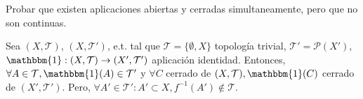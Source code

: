 \begin{ejr}[28]
  Probar que existen aplicaciones abiertas y cerradas simultaneamente, pero que no son continuas.
\end{ejr}

\begin{sol}[28]
  Sea $( X, \mathcal{T} )$, $( X, \mathcal{T}' )$, e.t. tal que $\mathcal{T} = \{ \emptyset, X \}$ topología trivial, $\mathcal{T}' = \mathcal{P}(X')$, $\mathbbm{1}:( X, \mathcal{T} ) \to ( X', \mathcal{T}' )$ aplicación identidad. Entonces, $\forall A \in \mathcal{T}, \mathbbm{1}(A) \in \mathcal{T}'$ y $\forall C$ cerrado de $( X, \mathcal{T} ), \mathbbm{1}(C)$ cerrado de $( X', \mathcal{T}' )$. Pero, $\forall A' \in \mathcal{T}': A' \subset X, f^{-1}(A')\not \in \mathcal{T}$.
\end{sol}
